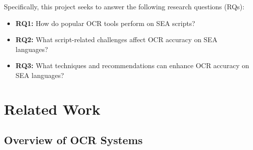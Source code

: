 \documentclass[12pt,oneside]{memoir}
\begin{document}
Specifically, this project seeks to answer the following research questions (RQs):

\begin{itemize}
    \item \textbf{RQ1:} How do popular OCR tools perform on SEA scripts?
    \item \textbf{RQ2:} What script-related challenges affect OCR accuracy on SEA languages?
    \item \textbf{RQ3:} What techniques and recommendations can enhance OCR accuracy on SEA languages?
\end{itemize}

\chapter{Related Work}

\section{Overview of OCR Systems}



\end{document}
